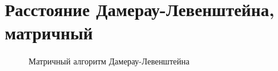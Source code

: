 \documentclass[12pt,a4paper]{report}
\begin{document}
\section{Расстояние Дамерау-Левенштейна, матричный}
\begin{figure}[ht]
    \caption{Матричный алгоритм Дамерау-Левенштейна}
\end{figure}
\end{document}
